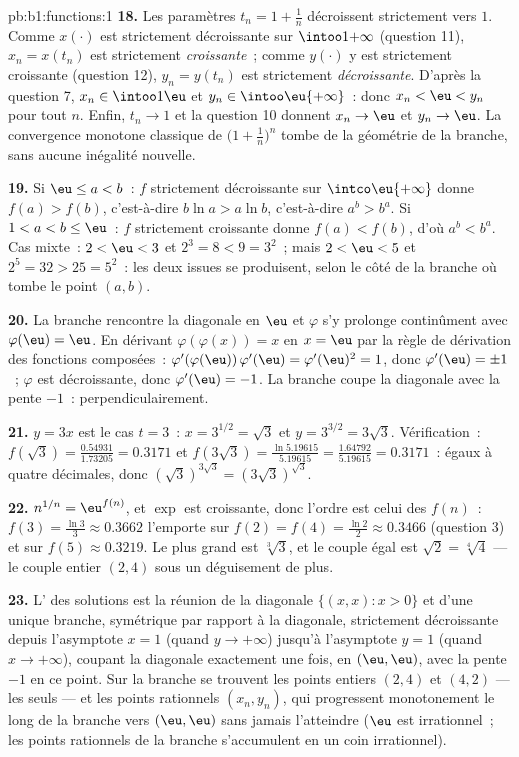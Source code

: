 \begin{solution}{pb:b1:functions:1}
\textbf{18.} Les paramètres $t_n = 1 + \frac1n$ décroissent
strictement vers $1$. Comme $x(\cdot)$ est strictement décroissante
sur $\intoo1{+\infty}$ (question 11), $x_n = x(t_n)$ est strictement
\emph{croissante}~; comme $y(\cdot)$ y est strictement croissante
(question 12), $y_n = y(t_n)$ est strictement \emph{décroissante}.
D'après la question 7, $x_n \in \intoo1\eu$ et $y_n \in
\intoo\eu{+\infty}$~: donc $x_n < \eu < y_n$ pour tout $n$. Enfin,
$t_n \to 1$ et la question 10 donnent $x_n \to \eu$ et $y_n \to \eu$.
La convergence monotone classique de $\bigl(1 + \frac1n\bigr)^n$
tombe de la géométrie de la branche, sans aucune inégalité nouvelle.

\textbf{19.} Si $\eu \leq a < b$~: $f$ strictement décroissante sur
$\intco\eu{+\infty}$ donne $f(a) > f(b)$, c'est-à-dire $b\ln a > a\ln
b$, c'est-à-dire $a^b > b^a$. Si $1 < a < b \leq \eu$~: $f$
strictement croissante donne $f(a) < f(b)$, d'où $a^b < b^a$. Cas
mixte~: $2 < \eu < 3$ et $2^3 = 8 < 9 = 3^2$~; mais $2 < \eu < 5$ et
$2^5 = 32 > 25 = 5^2$~: les deux issues se produisent, selon le côté
de la branche où tombe le point $(a, b)$.

\textbf{20.} La branche rencontre la diagonale en $\eu$ et $\varphi$
s'y prolonge continûment avec $\varphi(\eu) = \eu$. En dérivant
$\varphi(\varphi(x)) = x$ en $x = \eu$ par la règle de dérivation des
fonctions composées~: $\varphi'(\varphi(\eu))\,\varphi'(\eu) =
\varphi'(\eu)^2 = 1$, donc $\varphi'(\eu) = \pm1$~; $\varphi$ est
décroissante, donc $\varphi'(\eu) = -1$. La branche coupe la
diagonale avec la pente $-1$~: perpendiculairement.

\textbf{21.} $y = 3x$ est le cas $t = 3$~: $x = 3^{1/2} = \sqrt3$
et $y = 3^{3/2} = 3\sqrt3$. Vérification~: $f(\sqrt3) =
\frac{0.54931}{1.73205} = 0.3171$ et $f(3\sqrt3) =
\frac{\ln 5.19615}{5.19615} = \frac{1.64792}{5.19615} = 0.3171$~:
égaux à quatre décimales, donc $(\sqrt3)^{3\sqrt3} =
(3\sqrt3)^{\sqrt3}$.

\textbf{22.} $n^{1/n} = \eu^{f(n)}$, et $\exp$ est croissante, donc
l'ordre est celui des $f(n)$~: $f(3) = \frac{\ln3}3 \approx
0.3662$ l'emporte sur $f(2) = f(4) = \frac{\ln2}2 \approx 0.3466$
(question 3) et sur $f(5) \approx 0.3219$. Le plus grand est
$\sqrt[3]3$, et le couple égal est $\sqrt2 = \sqrt[4]4$ --- le couple
entier $(2, 4)$ sous un déguisement de plus.

\textbf{23.} L' des solutions est la réunion de la diagonale
$\{(x, x) : x > 0\}$ et d'une unique branche, symétrique par rapport
à la diagonale, strictement décroissante depuis l'asymptote $x = 1$
(quand $y \to +\infty$) jusqu'à l'asymptote $y = 1$ (quand $x \to
+\infty$), coupant la diagonale exactement une fois, en $(\eu, \eu)$,
avec la pente $-1$ en ce point. Sur la branche se trouvent les points
entiers $(2, 4)$ et $(4, 2)$ --- les seuls --- et les points
rationnels $(x_n, y_n)$, qui progressent monotonement le long de la
branche vers $(\eu, \eu)$ sans jamais l'atteindre ($\eu$ est
irrationnel~; les points rationnels de la branche s'accumulent en un
coin irrationnel).


\end{solution}
